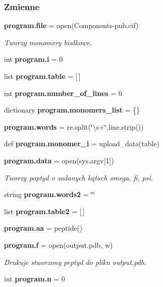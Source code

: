 \subsubsection*{Zmienne}
\begin{DoxyCompactItemize}
\item 
\textbf{ program.\+file} = open(\textquotesingle{}Components-\/pub.\+cif\textquotesingle{})
\begin{DoxyCompactList}\small\item\em Tworzy monomery białkowe. \end{DoxyCompactList}\item 
int \textbf{ program.\+i} = 0
\item 
list \textbf{ program.\+table} = [$\,$]
\item 
int \textbf{ program.\+number\+\_\+of\+\_\+lines} = 0
\item 
dictionary \textbf{ program.\+monomers\+\_\+list} = \{\}
\item 
\textbf{ program.\+words} = re.\+split(\char`\"{}\textbackslash{}s+\char`\"{},line.\+strip())
\item 
def \textbf{ program.\+monomer\+\_\+i} = upload\+\_\+data(table)
\item 
\textbf{ program.\+data} = open(sys.\+argv[1])
\begin{DoxyCompactList}\small\item\em Tworzy poptyd o zadanych kątach omega, fi, psi. \end{DoxyCompactList}\item 
string \textbf{ program.\+words2} = \char`\"{}\char`\"{}
\item 
list \textbf{ program.\+table2} = [$\,$]
\item 
\textbf{ program.\+aa} = peptide()
\item 
\textbf{ program.\+f} = open(\textquotesingle{}output.\+pdb\textquotesingle{}, \textquotesingle{}w\textquotesingle{})
\begin{DoxyCompactList}\small\item\em Drukuje stworzony peptyd do pliku output.\+pdb. \end{DoxyCompactList}\item 
int \textbf{ program.\+n} = 0
\end{DoxyCompactItemize}
